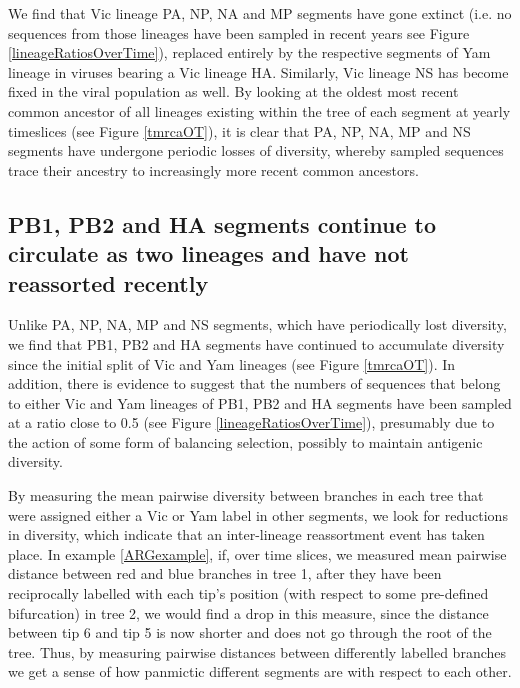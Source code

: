 \documentclass[11pt,oneside,letterpaper]{article}
\begin{document}
We find that Vic lineage PA, NP, NA and MP segments have gone extinct (i.e. no sequences from those lineages have been sampled in recent years see Figure \ref{lineageRatiosOverTime}), replaced entirely by the respective segments of Yam lineage in viruses bearing a Vic lineage HA.
Similarly, Vic lineage NS has become fixed in the viral population as well.
By looking at the oldest most recent common ancestor of all lineages existing within the tree of each segment at yearly timeslices (see Figure \ref{tmrcaOT}), it is clear that PA, NP, NA, MP and NS segments have undergone periodic losses of diversity, whereby sampled sequences trace their ancestry to increasingly more recent common ancestors.


\subsection*{PB1, PB2 and HA segments continue to circulate as two lineages and have not reassorted recently}
Unlike PA, NP, NA, MP and NS segments, which have periodically lost diversity, we find that PB1, PB2 and HA segments have continued to accumulate diversity since the initial split of Vic and Yam lineages (see Figure \ref{tmrcaOT}).
In addition, there is evidence to suggest that the numbers of sequences that belong to either Vic and Yam lineages of PB1, PB2 and HA segments have been sampled at a ratio close to 0.5 (see Figure \ref{lineageRatiosOverTime}), presumably due to the action of some form of balancing selection, possibly to maintain antigenic diversity.

By measuring the mean pairwise diversity between branches in each tree that were assigned either a Vic or Yam label in other segments, we look for reductions in diversity, which indicate that an inter-lineage reassortment event has taken place.
In example \ref{ARGexample}, if, over time slices, we measured mean pairwise distance between red and blue branches in tree 1, after they have been reciprocally labelled with each tip's position (with respect to some pre-defined bifurcation) in tree 2, we would find a drop in this measure, since the distance between tip 6 and tip 5 is now shorter and does not go through the root of the tree.
Thus, by measuring pairwise distances between differently labelled branches we get a sense of how panmictic different segments are with respect to each other.
\end{document}
